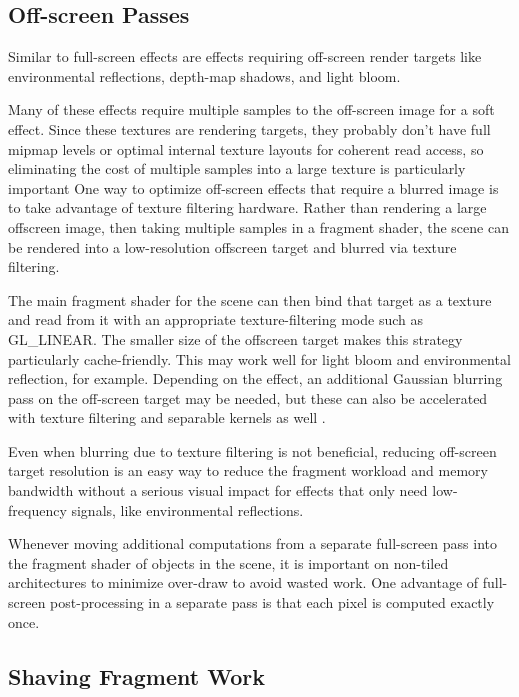 \subsection{Off-screen Passes}
\label{Jon-McCaffrey-Off-Screen-Pass}

Similar to full-screen effects are effects requiring off-screen render targets
like environmental reflections, depth-map shadows, and light bloom.

Many of these effects require multiple samples to the off-screen image for a
soft effect.  Since these textures are rendering targets, they probably don't
have full mipmap levels or optimal internal texture layouts for coherent read
access, so eliminating the cost of multiple samples into a large texture is
particularly important One way to optimize off-screen effects that require a
blurred image is to take advantage of texture filtering hardware.  Rather than
rendering a large offscreen image, then taking multiple samples in a fragment
shader, the scene can be rendered into a low-resolution offscreen target and
blurred via texture filtering.

The main fragment shader for the scene can then bind that target as a texture
and read from it with an appropriate texture-filtering mode such as GL\_LINEAR.
The smaller size of the offscreen target makes this strategy particularly
cache-friendly.  This may work well for light bloom and environmental
reflection, for example.  Depending on the effect, an additional Gaussian
blurring pass on the off-screen target may be needed, but these can also be
accelerated with texture filtering and separable kernels as well \cite{Rideout}.

Even when blurring due to texture filtering is not beneficial, reducing
off-screen target resolution is an easy way to reduce the fragment workload
and memory bandwidth without a serious visual impact for effects that only need
low-frequency signals, like environmental reflections.

Whenever moving additional computations from a separate full-screen pass into
the fragment shader of objects in the scene, it is important on non-tiled
architectures to minimize over-draw to avoid wasted work.  One advantage of
full-screen post-processing in a separate pass is that each pixel is computed
exactly once.

\subsection{Shaving Fragment Work}
\label{Jon-McCaffrey-Shaving-Fragment-Work}

